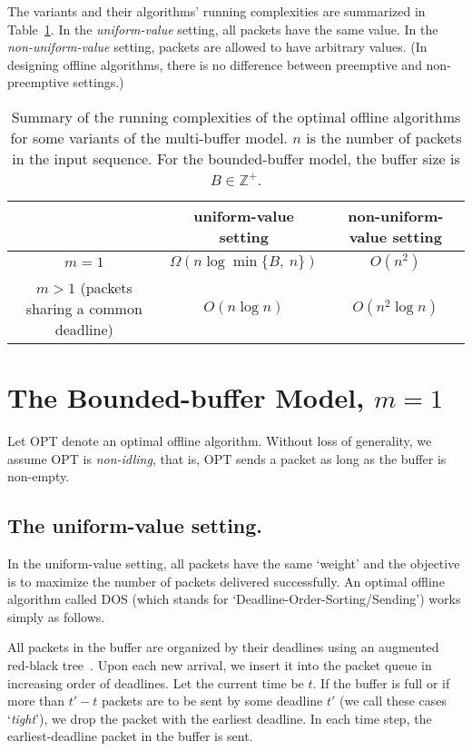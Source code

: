 \documentclass[final, 11pt]{article}
\begin{document}
The variants and their algorithms' running complexities are summarized in Table~\ref{tbl:summary}. In the {\em uniform-value} setting, all packets have the same value. In the {\em non-uniform-value} setting, packets are allowed to have arbitrary values. (In designing offline algorithms, there is no difference between preemptive and non-preemptive settings.)

\begin{table}[h]
\begin{tabular}{|c|c|c|}
\hline \hline
& uniform-value setting & non-uniform-value setting \\ \hline
$m = 1$ & $\Omega(n \log \min\{B, \ n\})$ & $O(n^2)$ \\ \hline
$m > 1$ (packets sharing a common deadline) & $O(n \log n)$ & $O(n^2 \log n)$ \\ \hline \hline
\end{tabular}
\label{tbl:summary}
\caption{Summary of the running complexities of the optimal offline algorithms for some variants of the multi-buffer model. $n$ is the number of packets in the input sequence. For the bounded-buffer model, the buffer size is $B \in \mathbb Z^+$.}
\end{table}


\section{The Bounded-buffer Model, $m = 1$}

Let OPT denote an optimal offline algorithm. Without loss of generality, we assume OPT is {\em non-idling}, that is, OPT sends a packet as long as the buffer is non-empty.


\subsection{The uniform-value setting.}

In the uniform-value setting, all packets have the same `weight' and the objective is to maximize the number of packets delivered successfully. An optimal offline algorithm called DOS (which stands for `Deadline-Order-Sorting/Sending') works simply as follows.

\begin{algorithm}
All packets in the buffer are organized by their deadlines using an augmented red-black tree~\cite{CLRS01}. Upon each new arrival, we insert it into the packet queue in increasing order of deadlines. Let the current time be $t$. If the buffer is full or if more than $t' - t$ packets are to be sent by some deadline $t'$ (we call these cases `{\em tight}'), we drop the packet with the earliest deadline. In each time step, the earliest-deadline packet in the buffer is sent.
\end{algorithm}
\end{document}
